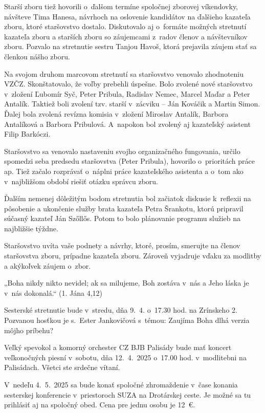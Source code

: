 Starší zboru tiež hovorili o~ďalšom termíne spoločnej zborovej víkendovky, návšteve Tima Hanesa, návrhoch na oslovenie kandidátov na ďalšieho kazateľa zboru, ktoré staršovstvo dostalo. Diskutovalo aj o~formáte možných stretnutí kazateľa zboru a starších zboru so záujemcami z~radov členov a návštevníkov zboru. Pozvalo na stretnutie sestru Tanjou Havoš, ktorá prejavila záujem stať sa členkou nášho zboru.

Na svojom druhom marcovom stretnutí sa staršovstvo venovalo zhodnoteniu VZČZ. Skonštatovalo, že voľby prebehli úspešne. Bolo zvolené nové staršovstvo v~zložení Ľubomír Syč, Peter Pribula, Radislav Nemec, Marcel Maďar a Peter Antalík. Taktiež boli zvolení tzv. starší v~zácviku -- Ján Kováčik a Martin Simon. Ďalej bola zvolená revízna komisia v~zložení Miroslav Antalík, Barbora Antalíková a Barbora Pribulová. A~napokon bol zvolený aj kazateľský asistent Filip Barkóczi.

Staršovstvo sa venovalo nastaveniu svojho organizačného fungovania, určilo spomedzi seba predsedu staršovstva (Peter Pribula), hovorilo o~prioritách práce ap. Tiež začalo rozprávať o~náplni práce kazateľského asistenta a o~tom ako v~najbližšom období riešiť otázku správcu zboru.

Ďalším nemenej dôležitým bodom stretnutia bol začiatok diskusie k~reflexii na pôsobenie a ukončenie služby brata kazateľa Petra Šrankotu, ktorú pripravil súčasný kazateľ Ján Szőllős. Potom to bolo plánovanie programu služieb na najbližšie týždne.

Staršovstvo uvíta vaše podnety a návrhy, ktoré, prosím, smerujte na členov staršovstva zboru, prípadne kazateľa zboru. Zároveň vyjadruje vďaku za modlitby a akýkoľvek záujem o~zbor.




„Boha nikdy nikto nevidel; ak sa milujeme, Boh zostáva v~nás a Jeho láska je v~nás dokonalá.“ (1. Jána 4,12)

Sesterské stretnutie bude v~stredu, dňa 9.~4. o~17.30 hod. na Zrínskeho 2. Pozvanou hosťkou je s.~Ester Jankovičová s~témou: Zaujíma Boha dlhá verzia môjho príbehu?

Veľký spevokol a komorný orchester CZ BJB Palisády bude mať koncert veľkonočných piesní v~sobotu, dňa 12.~4.~2025 o~17.00 hod. v~modlitebni na Palisádach.
Všetci ste srdečne vítaní.

V~nedeľu 4.~5.~2025 sa bude konať spoločné zhromaždenie v~čase konania sesterskej konferencie v~priestoroch SUZA na Drotárskej ceste. Je možné sa tu prihlásiť aj na spoločný obed. Cena pre jednu osobu je 12~€.

